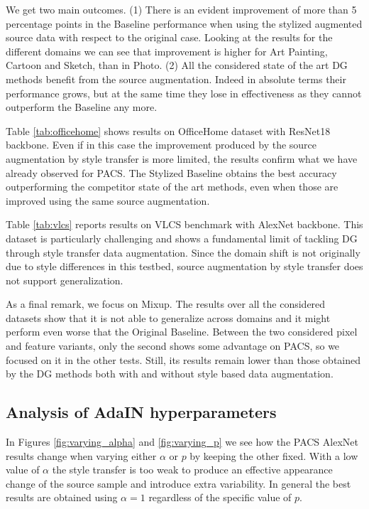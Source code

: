 We get two main outcomes. (1) There is an evident improvement of more than 5 percentage points in the Baseline performance when using the stylized augmented source data with respect to the original case.
Looking at the results for the different domains we can see that improvement is higher for Art Painting, Cartoon and Sketch, than in Photo. 
(2) All the considered state of the art DG methods benefit from the source augmentation. Indeed in absolute terms their performance grows, but at the same time they lose in effectiveness as they cannot outperform the Baseline any more.


Table \ref{tab:officehome} shows results on OfficeHome dataset with ResNet18 backbone. Even if in this case the improvement produced by the source augmentation by style transfer is more limited, the results confirm what we have already observed for PACS. The Stylized Baseline obtains the best accuracy outperforming the competitor state of the art methods, even when those are improved using the same source augmentation.

Table \ref{tab:vlcs} reports results on VLCS benchmark with AlexNet backbone. This dataset is particularly challenging and shows a fundamental limit of tackling DG through style transfer data augmentation. Since the domain shift is not originally due to style differences in this testbed, source augmentation by style transfer does not support generalization.

As a final remark, we focus on Mixup. The results over all the considered datasets show that it is not able to generalize across domains and it might perform even worse that the Original Baseline. Between the two considered pixel and feature variants, only the second shows some advantage on PACS, so we focused on it in the other tests. Still, its results remain lower than those obtained by the DG methods both with and without style based data augmentation. 

\subsection{Analysis of AdaIN hyperparameters}
\label{sec:sensitivity}
In Figures \ref{fig:varying_alpha} and \ref{fig:varying_p} we see how the PACS AlexNet results change when varying either $\alpha$ or $p$ by keeping the other fixed. With a low value of $\alpha$ the style transfer is too weak to produce an effective appearance change of the source sample and introduce extra variability. In general the best results are obtained using $\alpha = 1$ regardless of the specific value of $p$. 

